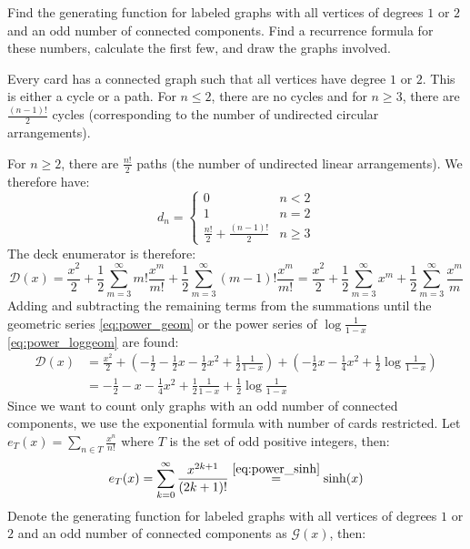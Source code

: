 \begin{exercise}
    \label{ex:3-7}
    Find the generating function for labeled graphs with all vertices of degrees $1$ or $2$ and an odd number of connected components. Find a recurrence formula for these numbers, calculate the first few, and draw the graphs involved.
\end{exercise}
\begin{solution}
    Every card has a connected graph such that all vertices have degree $1$ or $2$. This is either a cycle or a path. For $n\leq 2$, there are no cycles and for $n\geq 3$, there are $\frac{(n-1)!}{2}$ cycles (corresponding to the number of undirected circular arrangements).

    For $n\geq 2$, there are $\frac{n!}{2}$ paths (the number of undirected linear arrangements). We therefore have:
    \[
        d_n = \begin{cases}
            0 &  n < 2 \\
            1 & n = 2 \\
            \frac{n!}{2} + \frac{(n-1)!}{2} & n \geq 3
        \end{cases}
    \]
    The deck enumerator is therefore:
    \[
        \mathcal{D}(x) = \frac{x^2}{2} + \frac{1}{2}\sum_{m=3}^\infty m!\frac{x^m}{m!} + \frac{1}{2} \sum_{m=3}^\infty (m-1)!\frac{x^m}{m!} = \frac{x^2}{2} + \frac{1}{2}\sum_{m=3}^\infty x^m + \frac{1}{2} \sum_{m=3}^\infty\frac{x^m}{m}
    \]
    Adding and subtracting the remaining terms from the summations until the geometric series \eqref{eq:power_geom} or the power series of $\log\frac{1}{1-x}$ \eqref{eq:power_loggeom} are found:
    \begin{align*}
        \mathcal{D}(x) &= \frac{x^2}{2} + \left(-\frac{1}{2} - \frac{1}{2}x - \frac{1}{2}x^2 + \frac{1}{2}\frac{1}{1-x}\right) + \left(-\frac{1}{2}x - \frac{1}{4}x^2 + \frac{1}{2}\log\frac{1}{1-x}\right) \\
        &= -\frac{1}{2} - x - \frac{1}{4}x^2 + \frac{1}{2}\frac{1}{1-x} + \frac{1}{2}\log\frac{1}{1-x}
    \end{align*}
    Since we want to count only graphs with an odd number of connected components, we use the exponential formula with number of cards restricted. Let $e_T(x) = \sum_{n\in T} \frac{x^n}{n!}$ where $T$ is the set of odd positive integers, then:
    \[
        e_T(x) = \bsum[k] \frac{x^{2k+1}}{(2k+1)!} \estep{\eqref{eq:power_sinh}} \sinh(x)
    \]
    Denote the generating function for labeled graphs with all vertices of degrees $1$ or $2$ and an odd number of connected components as $\mathcal{G}(x)$, then:

\end{solution}

